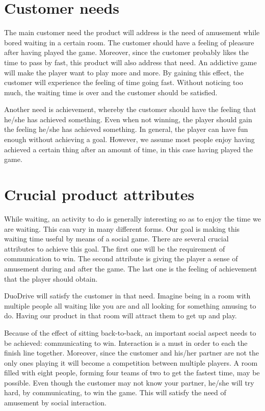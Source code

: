 \documentclass[11pt,twoside,a4paper]{article}
\begin{document}
\section{Customer needs}
The main customer need the product will address is the need of amusement while bored waiting in a certain room. The customer should have a feeling of pleasure after having played the game. Moreover, since the customer probably likes the time to pass by fast, this product will also address that need. An addictive game will make the player want to play more and more. By gaining this effect, the customer will experience the feeling of time going fast. Without noticing too much, the waiting time is over and the customer should be satisfied.

Another need is achievement, whereby the customer should have the feeling that he/she has achieved something. Even when not winning, the player should gain the feeling he/she has achieved something. In general, the player can have fun enough without achieving a goal. However, we assume most people enjoy having achieved a certain thing after an amount of time, in this case having played the game.


\section{Crucial product attributes}
While waiting, an activity to do is generally interesting so as to enjoy the time we are waiting. This can vary in many different forms. Our goal is making this waiting time useful by means of a social game. There are several crucial attributes to achieve this goal. The first one will be the requirement of communication to win. The second attribute is giving the player a sense of amusement during and after the game. The last one is the feeling of achievement that the player should obtain.

DuoDrive will satisfy the customer in that need. Imagine being in a room with multiple people all waiting like you are and all looking for something amusing to do. Having our product in that room will attract them to get up and play.

Because of the effect of sitting back-to-back, an important social aspect needs to be achieved: communicating to win. Interaction is a must in order to each the finish line together. Moreover, since the customer and his/her partner are not the only ones playing it will become a competition between multiple players. A room filled with eight people, forming four teams of two to get the fastest time, may be possible. Even though the customer may not know your partner, he/she will try hard, by communicating, to win the game. This will satisfy the need of amusement by social interaction.
\end{document}
